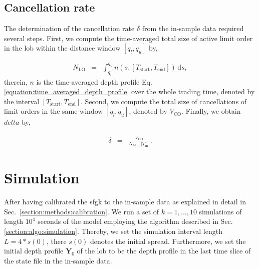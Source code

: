 \documentclass[11pt, a4paper]{thesis}  %
\newcommand{\dd}{\textrm{d}}
\begin{document}
\subsection{Cancellation rate}
\label{section:methods:calibrate_delta}
The determination of the cancellation rate $\delta$ from the in-sample data required several steps. First,
we compute the time-averaged total size of active limit order in the \ac{lob} within the distance window $[q_l, q_u]$ by,

\begin{eqnarray}
	N_\textrm{LO} &=& \int_{q_l}^{q_u} 
	n\left(s, [T_\textrm{start}, T_\textrm{end}]\right)\,\dd s,
\end{eqnarray}
%
therein, $n$ is the time-averaged depth profile Eq. \ref{equation:time_averaged_depth_profile} over the whole trading time, denoted by the interval $[T_\textrm{start}, T_\textrm{end}]$. Second, we compute the total size of cancellations of limit orders in the same window $[q_l, q_u]$, denoted by $V_\textrm{CO}$. Finally, we obtain $delta$ by, 

\begin{eqnarray}
	\delta &=& \frac{V_\textrm{CO}}{N_\textrm{LO}\cdot\left\lvert T_\textrm{in}\right\rvert}.
\end{eqnarray}



\section{Simulation}
\label{section:simulation}
After having calibrated the \ac{sfgk} to the in-sample data as explained in detail in Sec.~\ref{section:methods:calibration}. We run a set of $k= 1,...,10$ simulations of length $10^4$ seconds of the model employing the algorithm described in Sec.~ \ref{section:algo:simulation}.
Thereby, we set the simulation interval length $L=4*s(0)$, there $s(0)$ denotes the initial spread. Furthermore, we set the initial depth profile $\mathbf{Y}_0$ of the \ac{lob} to be the depth profile in the last time slice of the state file in the in-sample data.

\end{document}
